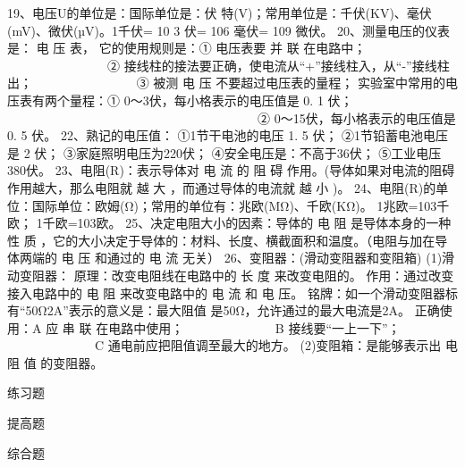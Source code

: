 \documentclass[12pt]{exam}
\renewcommand{\section}[1]{{\large\sffamily  #1} \par}
\begin{document}
19、电压U的单位是：国际单位是：伏 特(V)；常用单位是：千伏(KV)、毫伏(mV)、微伏(µV)。1千伏= 10 3 伏= 106 毫伏= 109 微伏。
20、测量电压的仪表是： 电 压 表，
它的使用规则是：① 电压表要 并 联 在电路中；
　　　　　　　　② 接线柱的接法要正确，使电流从“+”接线柱入，从“-”接线柱出；
　　　　　　　　③ 被测 电 压 不要超过电压表的量程；
实验室中常用的电压表有两个量程：① 0～3伏，每小格表示的电压值是 0. 1 伏；  
　　　　　　　　　　　　　　　　　　　　② 0～15伏，每小格表示的电压值是 0. 5 伏。
22、熟记的电压值：
①1节干电池的电压 1. 5 伏；
②1节铅蓄电池电压是 2  伏；
③家庭照明电压为220伏；
④安全电压是：不高于36伏；
⑤工业电压380伏。
23、电阻(R)：表示导体对  电 流 的 阻 碍 作用。(导体如果对电流的阻碍作用越大，那么电阻就 越 大 ，而通过导体的电流就  越 小 )。
24、电阻(R)的单位：国际单位：欧姆(Ω)；常用的单位有：兆欧(MΩ)、千欧(KΩ)。		    1兆欧=103千欧；       1千欧=103欧。
25、决定电阻大小的因素：导体的 电 阻 是导体本身的一种 性 质 ，它的大小决定于导体的：材料、长度、横截面积和温度。（电阻与加在导体两端的 电 压 和通过的 电 流 无关）
26、变阻器：(滑动变阻器和变阻箱)
   (1)滑动变阻器：
原理：改变电阻线在电路中的 长  度 来改变电阻的。
作用：通过改变接入电路中的 电 阻 来改变电路中的 电 流 和 电 压。
铭牌：如一个滑动变阻器标有“50Ω2A”表示的意义是：最大阻值 是50Ω，允许通过的最大电流是2A。
正确使用：A  应 串 联 在电路中使用；
　　　　　　　B  接线要“一上一下”；
　　　　　　　C 通电前应把阻值调至最大的地方。
   (2)变阻箱：是能够表示出 电 阻 值 的变阻器。



\section{练习题}














\begin{improveexercises}
\section{提高题}

\end{improveexercises}

\begin{advanceexercises}
\section{综合题}

\end{advanceexercises}

\end{document}

